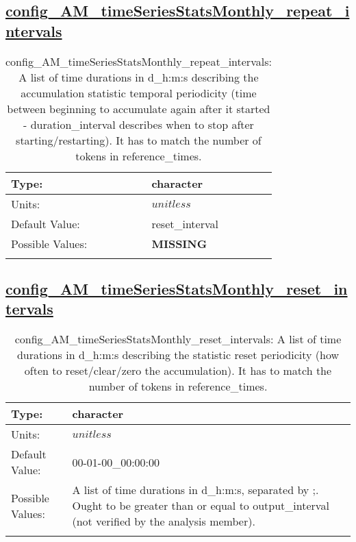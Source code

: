 \subsection[config\_AM\_timeSeriesStatsMonthly\_repeat\_intervals]{\hyperref[sec:nm_tab_AM_timeSeriesStatsMonthly]{config\_AM\_timeSeriesStatsMonthly\_repeat\_intervals}}
\label{subsec:nm_sec_config_AM_timeSeriesStatsMonthly_repeat_intervals}
\begin{center}
\begin{longtable}{| p{2.0in} || p{4.0in} |}
    \hline
    Type: & character \\
    \hline
    Units: & $unitless$ \\
    \hline
    Default Value: & reset\_interval \\
    \hline
    Possible Values: & {\bf \color{red} MISSING} \\
    \hline
    \caption{config\_AM\_timeSeriesStatsMonthly\_repeat\_intervals: A list of time durations in d\_h:m:s describing the accumulation statistic temporal periodicity (time between beginning to accumulate again after it started - duration\_interval describes when to stop after starting/restarting). It has to match the number of tokens in reference\_times.}
\end{longtable}
\end{center}
\subsection[config\_AM\_timeSeriesStatsMonthly\_reset\_intervals]{\hyperref[sec:nm_tab_AM_timeSeriesStatsMonthly]{config\_AM\_timeSeriesStatsMonthly\_reset\_intervals}}
\label{subsec:nm_sec_config_AM_timeSeriesStatsMonthly_reset_intervals}
\begin{center}
\begin{longtable}{| p{2.0in} || p{4.0in} |}
    \hline
    Type: & character \\
    \hline
    Units: & $unitless$ \\
    \hline
    Default Value: & 00-01-00\_00:00:00 \\
    \hline
    Possible Values: & A list of time durations in d\_h:m:s, separated by ;. Ought to be greater than or equal to output\_interval (not verified by the analysis member). \\
    \hline
    \caption{config\_AM\_timeSeriesStatsMonthly\_reset\_intervals: A list of time durations in d\_h:m:s describing the statistic reset periodicity (how often to reset/clear/zero the accumulation). It has to match the number of tokens in reference\_times.}
\end{longtable}
\end{center}
